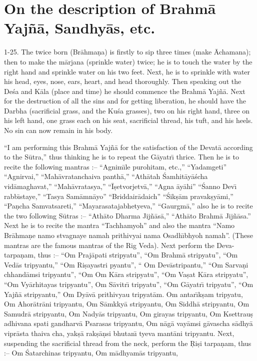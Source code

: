 \chapter{On the description of Brahm\=a Yaj\~n\=a, Sandhy\=as, etc.}

1-25. The twice born (Br\=ahma\d{n}a) is firstly to sip three times (make \=Achamana); then to make the m\=arjana (sprinkle water) twice; he is to touch the water by the right hand and sprinkle water on his two feet. Next, he is to sprinkle with water his head, eyes, nose, ears, heart, and head thoroughly. Then speaking out the De\'sa and K\=ala (place and time) he should commence the Brahm\=a Yaj\~n\=a. Next for the destruction of all the sins and for getting liberation, he should have the Darbha (sacrificial grass, and the Ku\'sa grasses), two on his right hand, three on his left hand, one grass each on his seat, sacrificial thread, his tuft, and his heels. No sin can now remain in his body.

``I am performing this Brahm\=a Yaj\~n\=a for the satisfaction of the Devat\=a according to the S\=utra,'' thus thinking he is to repeat the G\=ayatr\={\i} thrice. Then he is to recite the following mantras :-- ``Agnim\={\i}le purohitam, etc.,'' ``Yadamgeti'' ``Agnirvai,'' ``Mah\=avratanchaiva panth\=a,'' ``Ath\=atah \'Samhit\=ay\=a\'scha vid\=amaghavat,'' ``Mah\=avratasya,'' ``\=I\d{s}etvorjetv\=a,'' ``Agna \=ay\=ahi'' ``\'Sanno Dev\={\i} rabb\={\i}staye,'' ``Tasya Sam\=amn\=ayo'' ``Briddair\=adaich'' ``\'Sik\d{s}\=am pravak\d{s}y\=ami,'' ``Pa\d{n}cha Samvatsareti,'' ``Mayarasatajabhetyeva,'' ``Gaurgm\=a,'' also he is to recite the two following S\=utras :-- ``Ath\=ato Dharma Jij\~n\=as\=a,'' ``Ath\=ato Brahm\=a Jij\~n\=asa.'' Next he is to recite the mantra ``Tachhamyoh'' and also the mantra ``Namo Br\=ahma\d{n}e namo stvagnaye namah prithivyai nama Osadh\={\i}bhyoh namah''. (These mantras are the famous mantras of the Rig Veda). Next perform the Deva-tarpa\d{n}am, thus :-- ``Om Praj\=apati stripyatu'', ``Om Brahm\=a stripyatu'', ``Om Ved\=as tripyantu,'' ``Om Ri\d{s}ayastri pyantu'', `` Om Dev\=astripantu,'' ``Om Sarva\d{n}i chhand\=amsi tripyantu'', ``Om Om K\=ara stripyatu'', ``Om Va\d{s}at K\=ara stripyatu'', ``Om Vy\=arhitayas tripyantu'', Om S\=avitr\={\i} tripyatu'', ``Om G\=ayatr\={\i} tripyatu'', ``Om Yaj\~n\=a stripyantu,'' Om Dy\=av\=a prithivyau tripyat\=am. Om antar\={\i}k\d{s}am tripyatu, Om Ahor\=atr\=ani tripyantu, Om S\=amkky\=a stripyantu, Om Siddh\=a stripyantu, Om Samudr\=a stripyantu, Om Nady\=as tripyantu, Om girayas tripyantu, Om Ksettrau\d{s} adhivana spati gandharv\=a Psarasas tripyantu, Om n\=ag\=a vay\=amsi g\=avascha s\=adhy\=a vipr\=asta thaiva cha, yak\d{s}\=a rak\d{s}\=a\d{n}si bhutan\={\i} tyeva mant\=ani tripyantu. Next, suspending the sacrificial thread from the neck, perform the \d{R}i\d{s}i tarpa\d{n}am, thus :-- Om \'Satarchinas tripyantu, Om m\=adhyam\=as tripyantu,

